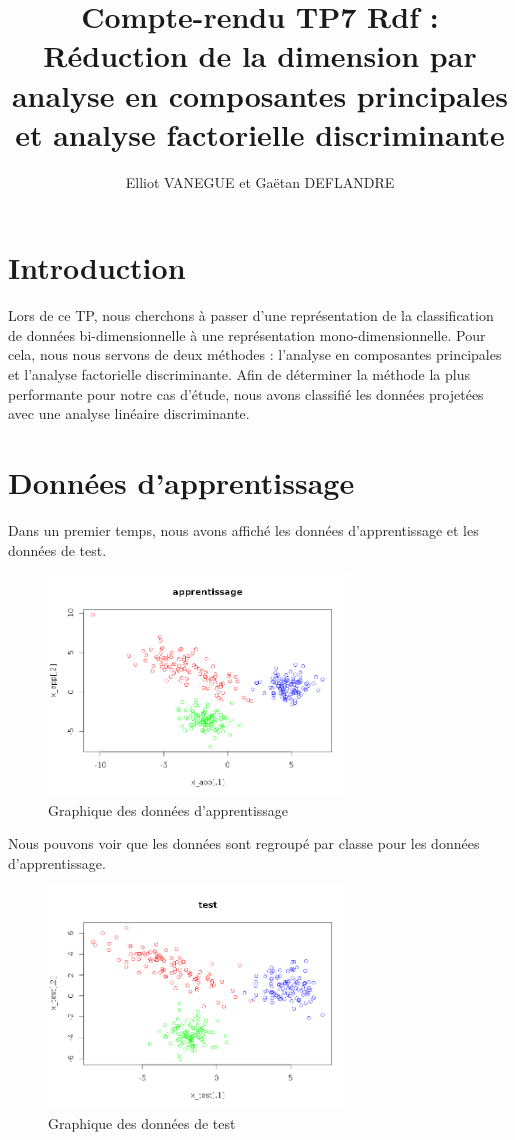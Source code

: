 \documentclass[a4paper,11pt]{article}
\title{Compte-rendu TP7 Rdf : Réduction de la dimension par analyse en composantes principales et analyse factorielle discriminante}
\author{Elliot VANEGUE et Gaëtan DEFLANDRE}
\begin{document}


  \maketitle
  
  \mbox{}
  \newpage
  \clearpage
  
  \section*{Introduction}
  Lors de ce TP, nous cherchons à passer d'une représentation de la classification de données
  bi-dimensionnelle à une représentation mono-dimensionnelle. Pour cela, nous nous servons de
  deux méthodes : l'analyse en composantes principales et l'analyse factorielle discriminante.
  Afin de déterminer la méthode la plus performante pour notre cas d'étude, nous avons classifié
  les données projetées avec une analyse linéaire discriminante.
 
  \section{Données d'apprentissage}
  Dans un premier temps, nous avons affiché les données d'apprentissage et les données de test.
  
  \begin{figure}[H]
    \center
   \includegraphics[width=8cm]{donnees_apprentissage.png}
   \caption{Graphique des données d'apprentissage}
  \end{figure}
  
  Nous pouvons voir que les données sont regroupé par classe pour les données d'apprentissage.
  
  \begin{figure}[H]
  \center
   \includegraphics[width=8cm]{donnees_test.png}
   \caption{Graphique des données de test}
  \end{figure}
  
\end{document}

